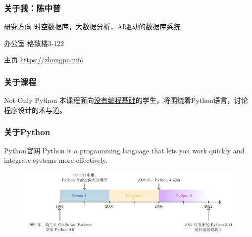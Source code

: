 \documentclass[aspectratio=169, 14pt]{beamer}
\begin{document}
\begin{frame}
	\frametitle{关于我：陈中普}

	\begin{block}{ 研究方向}
		时空数据库，大数据分析，AI驱动的数据库系统
	\end{block}

	\begin{block}{ 办公室}
		格致楼3-122
	\end{block}

	\begin{block}{ 主页}
		\href{https://zhongpu.info}{https://zhongpu.info}
	\end{block}

\end{frame}
\begin{frame}
	\frametitle{关于课程}
	\begin{block}{Not Only Python}
		本课程面向\underline{没有编程基础}的学生，将围绕着Python语言，讨论程序设计的\alert{术}与\alert{道}。
	\end{block}
\end{frame}

\begin{frame}
	\frametitle{关于Python}
	\begin{block}{Python官网}
		Python is a programming language that lets you work quickly and integrate systems more effectively.
	\end{block}

	\begin{figure}
		\center
		\includegraphics[height=.45\paperheight]{week1/Timeline.pdf}
	\end{figure}
\end{frame}
\end{document}
